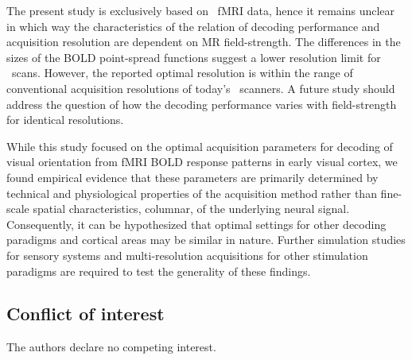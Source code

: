 The present study is exclusively based on \sevenT\ fMRI data, hence it remains
unclear in which way the characteristics of the relation of decoding
performance and acquisition resolution are dependent on MR field-strength. The
differences in the sizes of the BOLD point-spread functions
\citep{shmuel_2007,engel_1997} suggest a lower resolution limit for \threeT\
scans. However, the reported optimal resolution is within the range of
conventional acquisition resolutions of today's \threeT\ scanners. A future
study should address the question of how the decoding performance varies with
field-strength for identical resolutions.

While this study focused on the optimal acquisition parameters for decoding of
visual orientation from fMRI BOLD response patterns in early visual cortex, we
found empirical evidence that these parameters are primarily determined by
technical and physiological properties of the acquisition method rather than
fine-scale spatial characteristics, \eg columnar, of the underlying neural signal.
Consequently, it can be hypothesized that optimal settings for other decoding
paradigms and cortical areas may be similar in nature. Further simulation
studies for sensory systems and multi-resolution acquisitions for other
stimulation paradigms are required to test the generality of these findings.

\subsection*{Conflict of interest}

\noindent The authors declare no competing interest.
